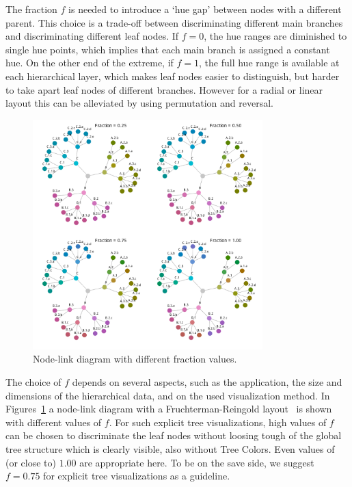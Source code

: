\documentclass[journal]{vgtc}                %
\begin{document}
The fraction $f$ is needed to introduce a `hue gap' between nodes with a different parent. This choice is a trade-off between discriminating different main branches and discriminating different leaf nodes. If $f=0$, the hue ranges are diminished to single hue points, which implies that each main branch is assigned a constant hue. On the other end of the extreme, if $f=1$, the full hue range is available at each hierarchical layer, which makes leaf nodes easier to distinguish, but harder to take apart leaf nodes of different branches. However for a radial or linear layout this can be alleviated by using permutation and reversal.

\begin{figure}[tb]
  \centering
  \includegraphics[width=3.5in]{Graph_hue.pdf}
  \caption{Node-link diagram with different fraction values.}\label{fig:graphf}
\end{figure}

The choice of $f$ depends on several aspects, such as the application, the size and dimensions of the hierarchical data, and on the used visualization method. In Figures~\ref{fig:graphf} a node-link diagram with a Fruchterman-Reingold layout~\cite{Fruchterman91} is shown with different values of ${f}$. For such explicit tree visualizations, high values of ${f}$ can be chosen to discriminate the leaf nodes without loosing tough of the global tree structure which is clearly visible, also without Tree Colors. Even values of (or close to) $1.00$ are appropriate here. To be on the save side, we suggest $f=0.75$ for explicit tree visualizations as a guideline.
\end{document}
